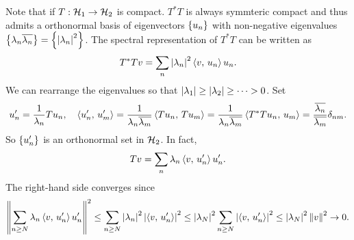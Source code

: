 \begin{remark}
    Note that if $T:\mathcal{H}_1\to\mathcal{H}_2$ is compact. $T^*T$ is always 
    symmteric compact and thus admits a orthonormal basis of 
    eigenvectors $\left\{ {u_n} \right\}$ with non-negative eigenvalues 
    $\left\{ {\lambda_n\overline{\lambda_n}} \right\} = \left\{ {\left\lvert {\lambda_n} \right\rvert^2} \right\}$. 
    The spectral representation of $T^*T$ can be written as 
    \begin{equation*}
        T^*Tv = \sum_n \left\lvert {\lambda_n} \right\rvert^2\left\langle {v},\, {u_n} \right\rangle u_n. 
    \end{equation*}
    We can rearrange the eigenvalues so that $\left\lvert {\lambda_1} \right\rvert\geq
    \left\lvert {\lambda_2} \right\rvert\geq\cdots >0$. Set 
    \begin{equation*}
        u'_n = \frac{1}{\lambda_n}Tu_n,\quad 
        \left\langle {u_n'},\, {u_m'} \right\rangle = \frac{1}{\lambda_n\overline{\lambda_m}}\left\langle {Tu_n},\, {Tu_m} \right\rangle 
        = \frac{1}{\lambda_n\overline{\lambda_m}}\left\langle {T^*Tu_n},\, {u_m} \right\rangle 
        = \frac{\overline{\lambda_n}}{\overline{\lambda_m}}\delta_{nm}.
    \end{equation*}
    So $\left\{ {u_n'} \right\}$ is an orthonormal set in $\mathcal{H}_2$. In fact, 
    \begin{equation*}
        Tv = \sum_n \lambda_n\left\langle {v},\, {u_n'} \right\rangle u_n'.
    \end{equation*}
    The right-hand side converges since 
    \begin{equation*}
        \left\lVert {\sum_{n\geq N} \lambda_n\left\langle {v},\, {u_n'} \right\rangle u_n'} \right\rVert^2 
        \leq \sum_{n\geq N} \left\lvert {\lambda_n} \right\rvert^2\left\lvert {\left\langle {v},\, {u_n'} \right\rangle} \right\rvert^2 
        \leq \left\lvert {\lambda_N} \right\rvert^2\sum_{n\geq N}\left\lvert {\left\langle {v},\, {u_n'} \right\rangle} \right\rvert^2 
        \leq \left\lvert {\lambda_N} \right\rvert^2\left\lVert {v} \right\rVert^2\to 0.
    \end{equation*}
\end{remark}

